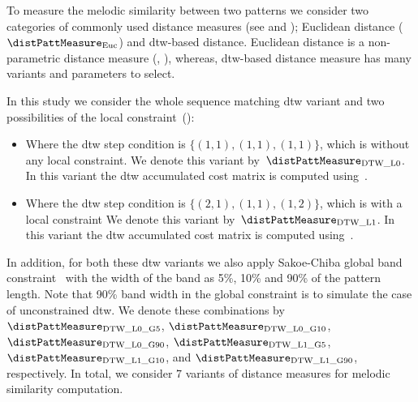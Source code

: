 To measure the melodic similarity between two patterns we consider two categories of commonly used distance measures (see  and ); Euclidean distance ($\distPattMeasure_{\mathrm{Euc}}$) and \acrfull{dtw}-based distance. Euclidean distance is a non-parametric distance measure (, ), whereas, \gls{dtw}-based distance measure has many variants and parameters to select. 

In this study we consider the whole sequence matching \gls{dtw} variant and two possibilities of the local constraint~():

\begin{itemize}
	\item Where the \gls{dtw} step condition is $\lbrace(1,1), (1,1), (1,1)\rbrace$, which is without any local constraint. We denote this variant by~$\distPattMeasure_{\mathrm{DTW\_L0}}$. In this variant the \gls{dtw} accumulated cost matrix is computed using~.
	\item Where the \gls{dtw} step condition is $\lbrace(2,1), (1,1), (1,2)\rbrace$, which is with a local constraint We denote this variant by~$\distPattMeasure_{\mathrm{DTW\_L1}}$. In this variant the \gls{dtw} accumulated cost matrix is computed using~.
\end{itemize}

In addition, for both these \gls{dtw} variants we also apply Sakoe-Chiba global band constraint~\citep{Sakoe78TASLP} with the width of the band as 5\%, 10\% and 90\% of the pattern length. Note that 90\% band width in the global constraint is to simulate the case of unconstrained \gls{dtw}. We denote these combinations by $\distPattMeasure_{\mathrm{DTW\_L0\_G5}}$, $\distPattMeasure_{\mathrm{DTW\_L0\_G10}}$, $\distPattMeasure_{\mathrm{DTW\_L0\_G90}}$, $\distPattMeasure_{\mathrm{DTW\_L1\_G5}}$, $\distPattMeasure_{\mathrm{DTW\_L1\_G10}}$, and $\distPattMeasure_{\mathrm{DTW\_L1\_G90}}$, respectively. In total, we consider 7 variants of distance measures for melodic similarity computation.

